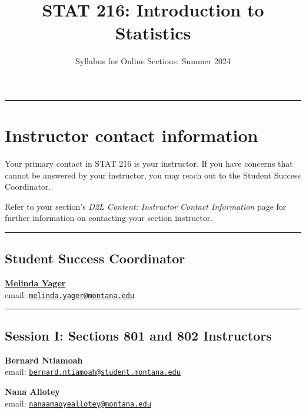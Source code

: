 \documentclass[
]{article}
\title{STAT 216: Introduction to Statistics}
\author{Syllabus for Online Sections: Summer 2024}
\date{}
\begin{document}
\maketitle

{
\setcounter{tocdepth}{3}
\tableofcontents
}
\begin{center}\rule{0.5\linewidth}{0.5pt}\end{center}

\section{Instructor contact
information}\label{instructor-contact-information}

Your primary contact in STAT 216 is your instructor. If you have
concerns that cannot be answered by your instructor, you may reach out
to the Student Success Coordinator.

Refer to your section's \emph{D2L Content: Instructor Contact
Information} page for further information on contacting your section
instructor.

\begin{center}\rule{0.5\linewidth}{0.5pt}\end{center}

\subsection{Student Success
Coordinator}\label{student-success-coordinator}

\href{https://www.math.montana.edu/directory/faculty/1582830/melinda-yager}{\textbf{Melinda
Yager}}\\
email:
\href{mailto:melinda.yager@montana.edu}{\nolinkurl{melinda.yager@montana.edu}}

\begin{center}\rule{0.5\linewidth}{0.5pt}\end{center}

\subsection{Session I: Sections 801 and 802
Instructors}\label{session-i-sections-801-and-802-instructors}

\textbf{Bernard Ntiamoah}\\
email:
\href{mailto:bernard.ntiamoah@student.montana.edu}{\nolinkurl{bernard.ntiamoah@student.montana.edu}}

\textbf{Nana Allotey}\\
email:
\href{mailto:nanaamaoyeallotey@montana.edu}{\nolinkurl{nanaamaoyeallotey@montana.edu}}
\end{document}
